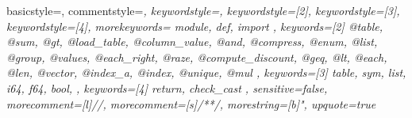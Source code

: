 \newcommand{\refSec}[1]{Sec.~\ref{#1}}
\newcommand{\refFig}[1]{Fig.~\ref{#1}}
\newcommand{\refTable}[1]{Table~\ref{#1}}
\newcommand{\refListing}[1]{Listing~\ref{#1}}
\newcommand{\refAlgo}[1]{Algo.~\ref{#1}}
\newcommand{\refFoot}[1]{\footnote{\footnotesize{#1}}}

\usepackage{textcomp} %
{ basicstyle=\footnotesize\ttfamily,
  commentstyle=\color{Grey}\rmfamily\itshape,
  keywordstyle=\color{SlightPink},
  keywordstyle=[2]\color{NiceBlue},
  keywordstyle=[3]\color{NiceRed},
  keywordstyle=[4]\color{SlightRed},
  morekeywords={
  module,
  def,
  import
  },
  keywords=[2]{
  @table,
  @sum,
  @gt,
  @load_table,
  @column_value,
  @and,
  @compress,
  @enum,
  @list,
  @group,
  @values,
  @each_right,
  @raze,
  @compute_discount,
  @geq,
  @lt,
  @each,
  @len,
  @vector,
  @index_a,
  @index,
  @unique,
  @mul
  },
  keywords=[3]{
  table,
  sym,
  list,
  i64,
  f64,
  bool,
  },
  keywords=[4]{
  return,
  check_cast
  },
  sensitive=false, %
  morecomment=[l]{//}, %
  morecomment=[s]{/*}{*/}, %
  morestring=[b]", %
  upquote=true %
}

\usepackage{balance} %




